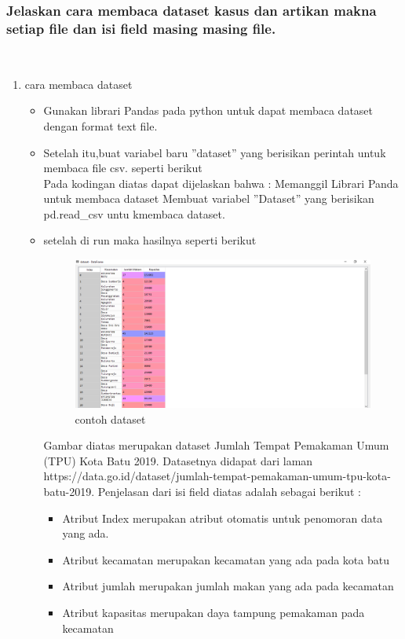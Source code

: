 \subsubsection{Jelaskan cara membaca dataset kasus dan artikan makna setiap ﬁle dan isi ﬁeld masing masing ﬁle.}
\hfill\\
\begin{enumerate}
\item cara membaca dataset
\hfill\\
	\begin{itemize}
	\item Gunakan librari Pandas pada python untuk dapat membaca dataset dengan format text ﬁle.
	\item Setelah itu,buat variabel baru ”dataset” yang berisikan perintah untuk membaca ﬁle csv. seperti berikut
	\hfill\\
	
	Pada kodingan diatas dapat dijelaskan bahwa : Memanggil Librari Panda untuk membaca dataset Membuat variabel ”Dataset” yang berisikan pd.read\_csv untu kmembaca dataset.
	
	\item setelah di run maka hasilnya seperti berikut
	\hfill\\
\begin{figure}[H]
	\centering
	\includegraphics[width=12cm]{figures/1174077/3/2.png}
	\caption{contoh dataset}
\end{figure}
	
	Gambar diatas merupakan dataset Jumlah Tempat Pemakaman Umum (TPU) Kota Batu 2019. Datasetnya didapat dari laman https://data.go.id/dataset/jumlah-tempat-pemakaman-umum-tpu-kota-batu-2019. Penjelasan dari isi ﬁeld diatas adalah sebagai berikut :
	\begin{itemize}
	\item Atribut Index merupakan atribut otomatis untuk penomoran data yang ada. 
	\item Atribut kecamatan merupakan kecamatan yang ada pada kota batu
	\item Atribut jumlah merupakan jumlah makan yang ada pada kecamatan
	\item Atribut kapasitas merupakan daya tampung pemakaman pada kecamatan
	\end{itemize}
	\end{itemize}
\end{enumerate}

